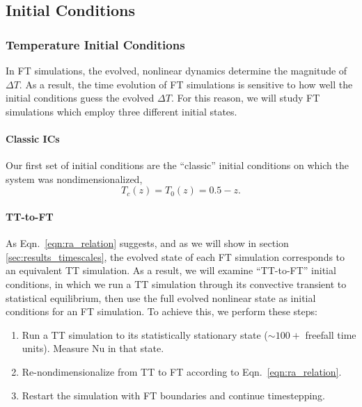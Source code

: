 \documentclass[aps, pre, onecolumn, nofootinbib, notitlepage, groupedaddress, amsfonts, amssymb, amsmath, longbibliography, superscriptaddress]{revtex4-1}
\newcommand{\ea}[1]{{\color{red} #1}}
\begin{document}
\subsection{Initial Conditions}

\subsubsection{Temperature Initial Conditions}

\ea{In FT simulations, } the evolved, nonlinear dynamics determine the magnitude of \ea{$\Delta T$.}
\ea{As a result,} the time evolution of FT simulations is sensitive to \ea{how well} the initial conditions \ea{guess the evolved $\Delta T$.}
For this reason, we will study FT simulations which employ three different initial states.

\paragraph{Classic ICs} 
Our first set of initial conditions are the ``classic'' initial conditions on which the system was nondimensionalized,
\begin{equation}
T_c(z) = T_0(z) = 0.5 - z.
\end{equation}

\paragraph{TT-to-FT}
As Eqn.~\ref{eqn:ra_relation} suggests, and as we will show in section \ref{sec:results_timescales}, the evolved state of each FT simulation corresponds to an equivalent TT simulation.
As a result, we will examine ``TT-to-FT'' initial conditions, in which we run a TT simulation through its convective transient to statistical equilibrium, then use the full evolved nonlinear state as initial conditions for an FT simulation.
To achieve this, we perform these steps:
\begin{enumerate}
\item Run a TT simulation to its statistically stationary state ($\sim100+$ freefall time units). 
Measure $\text{Nu}$ in that state.
\item Re-nondimensionalize from TT to FT according to Eqn.~\ref{eqn:ra_relation}.
\item Restart the simulation with FT boundaries and continue timestepping.
\end{enumerate}
\end{document}
